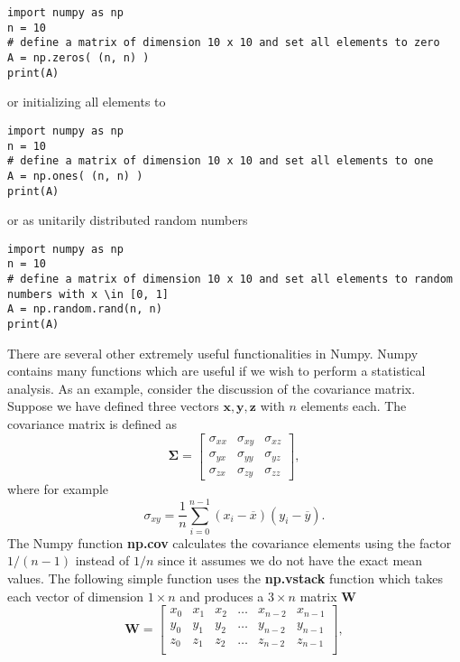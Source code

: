 \documentclass[%
oneside,                 %
final,                   %
10pt]{article}
\begin{document}
\begin{verbatim}
import numpy as np
n = 10
# define a matrix of dimension 10 x 10 and set all elements to zero
A = np.zeros( (n, n) )
print(A) 

\end{verbatim}

or initializing all elements to 






\begin{verbatim}
import numpy as np
n = 10
# define a matrix of dimension 10 x 10 and set all elements to one
A = np.ones( (n, n) )
print(A) 

\end{verbatim}

or as unitarily distributed random numbers






\begin{verbatim}
import numpy as np
n = 10
# define a matrix of dimension 10 x 10 and set all elements to random numbers with x \in [0, 1]
A = np.random.rand(n, n)
print(A) 

\end{verbatim}


There are several other extremely useful functionalities in Numpy. Numpy contains many functions which are useful if we wish to perform a statistical analysis.
As an example, consider the discussion of the covariance matrix. Suppose we have defined three vectors
$\bm{x}, \bm{y}, \bm{z}$ with $n$ elements each. The covariance matrix is defined as 
\[
\bm{\Sigma} = \begin{bmatrix} \sigma_{xx} & \sigma_{xy} & \sigma_{xz} \\
                              \sigma_{yx} & \sigma_{yy} & \sigma_{yz} \\
                              \sigma_{zx} & \sigma_{zy} & \sigma_{zz} 
             \end{bmatrix},
\]
where for example
\[
\sigma_{xy} =\frac{1}{n} \sum_{i=0}^{n-1}(x_i- \overline{x})(y_i- \overline{y}).
\]
The Numpy function \textbf{np.cov} calculates the covariance elements using the factor $1/(n-1)$ instead of $1/n$ since it assumes we do not have the exact mean values. 
The following simple function uses the \textbf{np.vstack} function which takes each vector of dimension $1\times n$ and produces a $3\times n$ matrix $\bm{W}$
\[
\bm{W} = \begin{bmatrix} x_0 & x_1 & x_2 & \dots & x_{n-2} & x_{n-1} \\
                         y_0 & y_1 & y_2 & \dots & y_{n-2} & y_{n-1} \\
			 z_0 & z_1 & z_2 & \dots & z_{n-2} & z_{n-1} \\
             \end{bmatrix},
\]
\end{document}
